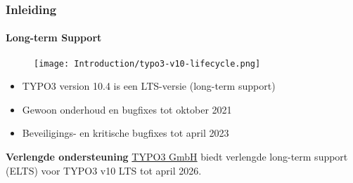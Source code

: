 
\begin{frame}[fragile]
	\frametitle{Inleiding}
	\framesubtitle{Long-term Support}

	\begin{figure}
		\texttt{[image: Introduction/typo3-v10-lifecycle.png]}
	\end{figure}

	\begin{itemize}
		\item TYPO3 version 10.4 is een LTS-versie (long-term support)
		\item Gewoon onderhoud en bugfixes tot oktober 2021
		\item Beveiligings- en kritische bugfixes tot april 2023
	\end{itemize}
	\vspace{0.2cm}
	\textbf{Verlengde ondersteuning}\newline
	\smaller
		\href{https://typo3.com}{TYPO3 GmbH} biedt verlengde long-term
			support (ELTS) voor TYPO3 v10 LTS tot april 2026.
	\normalsize

\end{frame}

